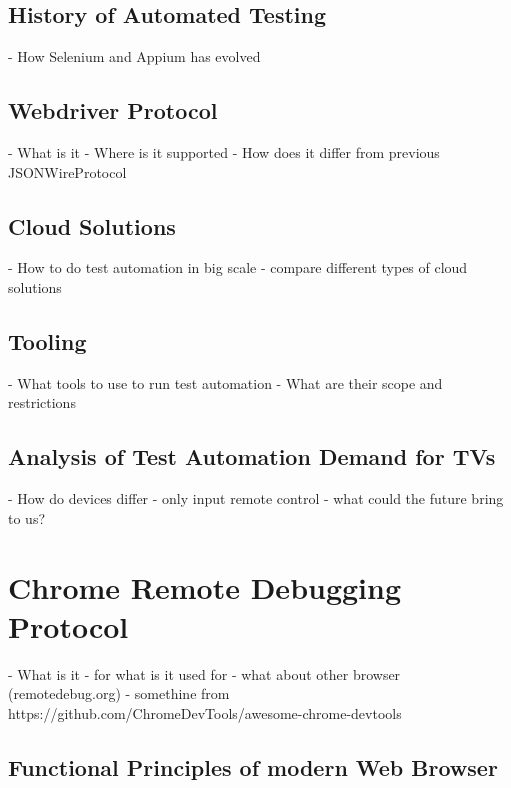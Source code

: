 \subsection{History of Automated Testing\label{sec:history}}

- How Selenium and Appium has evolved

\subsection{Webdriver Protocol\label{sec:webdriver}}

- What is it
- Where is it supported
- How does it differ from previous JSONWireProtocol

\subsection{Cloud Solutions\label{sec:cloud}}

- How to do test automation in big scale
- compare different types of cloud solutions

\subsection{Tooling\label{sec:tooling}}

- What tools to use to run test automation
- What are their scope and restrictions

\subsection{Analysis of Test Automation Demand for TVs\label{sec:testautomationontv}}

- How do devices differ
- only input remote control
- what could the future bring to us?

\section{Chrome Remote Debugging Protocol}

- What is it
- for what is it used for
- what about other browser (remotedebug.org)
- somethine from https://github.com/ChromeDevTools/awesome-chrome-devtools

\subsection{Functional Principles of modern Web Browser\label{sec:howbrowserwork}}

